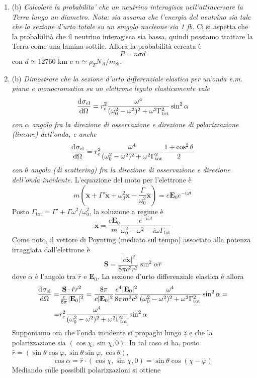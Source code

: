\documentclass{article}
\renewcommand{\b}{(b)}
\renewcommand{\t}[1]{\textit{ #1}}
\renewcommand{\vec}[1]{\mathbf{#1}}
\begin{document}
\begin{enumerate}
\item\b\t{Calcolare la probabilita’ che un neutrino interagisca nell’attraversare la Terra
lungo un diametro. Nota: sia assuma che l’energia del neutrino sia tale che la
sezione d’urto totale su un singolo nucleone sia 1 fb.}
Ci si aspetta che la probabilità che il neutrino interagisca sia bassa, quindi possiamo trattare la Terra come una lamina sottile. Allora la probabilità cercata è
\[P=n\sigma d\]
con $d\simeq12760$ km e $n\simeq\rho_TN_A/m_\textrm{Si}$. 
\item\b\t{Dimostrare che la sezione d’urto differenziale elastica per un’onda e.m. piana e
	monocromatica su un elettrone legato elasticamente vale \[\dfrac{\mathrm{d} ^{}\sigma_\mathrm{el}}{\mathrm{d} {\Omega}^{}} = r_e^2\frac{\omega^4}{
	(\omega_0^2-\omega^2)^2	+\omega^2\Gamma_\mathrm{tot}^2}\sin^2\alpha\]
	con $\alpha$ angolo fra la direzione di osservazione e direzione di polarizzazione
	(lineare) dell'onda, e anche \[\dfrac{\mathrm{d} ^{}\sigma_\mathrm{el}}{\mathrm{d} {\Omega}^{}} = r_e^2\frac{\omega^4}{
		(\omega_0^2-\omega^2)^2	+\omega^2\Gamma_\mathrm{tot}^2}\frac{1+\cos^2\theta}{2}\]
	con $\theta$ angolo (di
	scattering) fra la direzione di osservazione e direzione dell'onda incidente.} L'equazione del moto per l'elettrone è
\[m\left(\ddot{\vec{x}}+\Gamma'\dot{\vec{x}}+\omega_0^2\vec{x}-\frac{\Gamma}{\omega_0^2}\dddot{\vec{x}}\right)=e\vec{E}_0e^{-i\omega t}\]
Posto $\Gamma_\textrm{tot}=\Gamma'+\Gamma\omega^2/\omega_0^2$, la soluzione a regime è
\[\vec{x}=\frac{e\vec{E}_0}{m}\frac{e^{-i\omega t}}{\omega_0^2-\omega^2-i\omega\Gamma_\textrm{tot}}\]
Come noto, il vettore di Poynting (mediato sul tempo) associato alla potenza irraggiata dall'elettrone è
\[\vec{S}=\frac{|e\ddot{\vec{x}}|^2}{8\pi c^3r^2}\sin^2\alpha\hat{r}\]
dove $\alpha$ è l'angolo tra $\hat{r}$ e $\vec{E}_0$. La sezione d'urto differenziale elastica è allora
\begin{align*}\der{\sigma_\textrm{el}}{\Omega}=&\frac{\vec{S}\cdot\hat{r}r^2}{\frac{c}{8\pi}|\vec{E}_0|^2}=\frac{8\pi}{c|\vec{E}_0|^2}\frac{e^4|\vec{E}_0|^2}{8\pi m^2c^3}\frac{\omega^4}{(\omega_0^2-\omega^2)^2+\omega^2\Gamma^2_\textrm{tot}}\sin^2\alpha=\\=&r_e^2\frac{\omega^4}{(\omega_0^2-\omega^2)^2+\omega^2\Gamma^2_\textrm{tot}}\sin^2\alpha\end{align*} Supponiamo ora che l'onda incidente si propaghi lungo $\hat{z}$ e che la polarizzazione sia $(\cos\chi,\sin\chi,0)$. In tal caso si ha, posto $\hat{r}=(\sin\theta\cos\varphi,\sin\theta\sin\varphi,\cos\theta)$,
\[\cos\alpha=\hat{r}\cdot(\cos\chi,\sin\chi,0)=\sin\theta\cos(\chi-\varphi)\]
Mediando sulle possibili polarizzazioni si ottiene

\end{enumerate}
\end{document}
